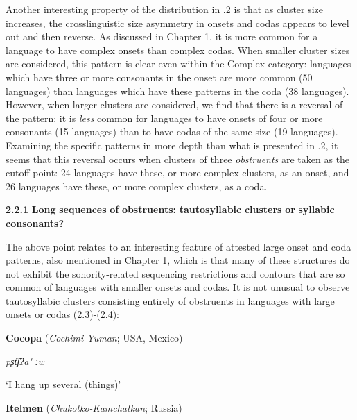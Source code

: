   Another interesting property of the distribution in .2 is that as cluster size increases, the crosslinguistic size asymmetry in onsets and codas appears to level out and then reverse. As discussed in Chapter 1, it is more common for a language to have complex onsets than complex codas. When smaller cluster sizes are considered, this pattern is clear even within the Complex category: languages which have three or more consonants in the onset are more common (50 languages) than languages which have these patterns in the coda (38 languages). However, when larger clusters are considered, we find that there is a reversal of the pattern: it is \textit{less} common for languages to have onsets of four or more consonants (15 languages) than to have codas of the same size (19 languages). Examining the specific patterns in more depth than what is presented in .2, it seems that this reversal occurs when clusters of three \textit{obstruents} are taken as the cutoff point: 24 languages have these, or more complex clusters, as an onset, and 26 languages have these, or more complex clusters, as a coda.



\textbf{2.2.1} \textbf{Long} \textbf{sequences} \textbf{of} \textbf{obstruents:} \textbf{tautosyllabic} \textbf{clusters} \textbf{or} \textbf{syllabic} \textbf{consonants?}



  The above point relates to an interesting feature of attested large onset and coda patterns, also mentioned in Chapter 1, which is that many of these structures do not exhibit the sonority-related sequencing restrictions and contours that are so common of languages with smaller onsets and codas. It is not unusual to observe tautosyllabic clusters consisting entirely of obstruents in languages with large onsets or codas (2.3)-(2.4):



\ea\label{ex:(2.3)}
   \textbf{Cocopa} (\textit{Cochimi-Yuman}; USA, Mexico)



  \textit{pʂt͡ʃʔa\'{} ːw}



  ‘I hang up several (things)’



  \citep[36]{Crawford1966}

\z


\ea\label{ex:(2.4)}
   \textbf{Itelmen} (\textit{Chukotko-Kamchatkan}; Russia)



